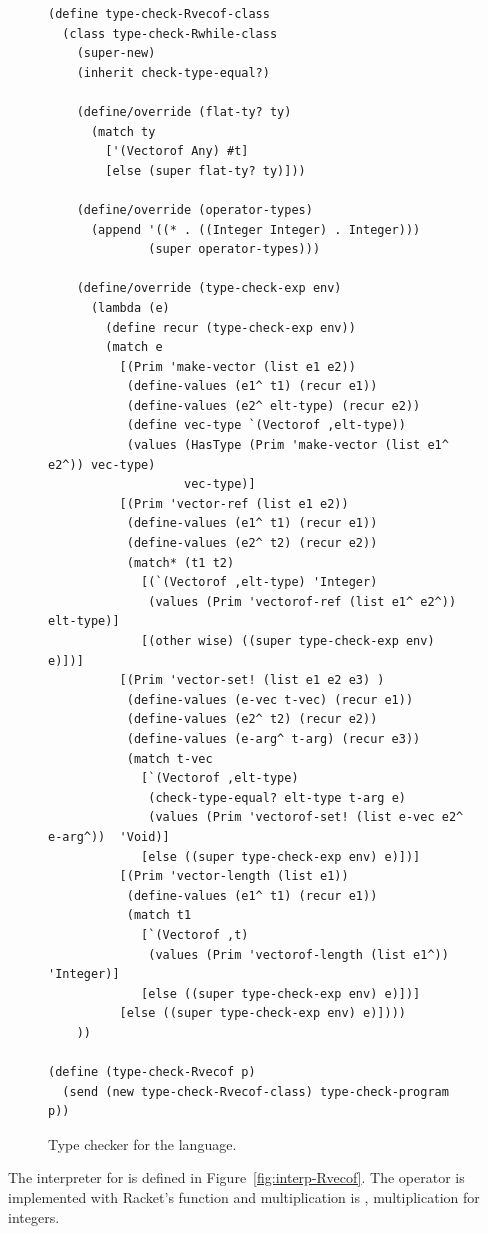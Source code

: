 \documentclass[11pt]{book}
\begin{document}
\begin{figure}[tbp]
\begin{lstlisting}[basicstyle=\ttfamily\footnotesize]
(define type-check-Rvecof-class
  (class type-check-Rwhile-class
    (super-new)
    (inherit check-type-equal?)

    (define/override (flat-ty? ty)
      (match ty
        ['(Vectorof Any) #t]
        [else (super flat-ty? ty)]))
    
    (define/override (operator-types)
      (append '((* . ((Integer Integer) . Integer)))
              (super operator-types)))
    
    (define/override (type-check-exp env)
      (lambda (e)
        (define recur (type-check-exp env))
        (match e
          [(Prim 'make-vector (list e1 e2))
           (define-values (e1^ t1) (recur e1))
           (define-values (e2^ elt-type) (recur e2))
           (define vec-type `(Vectorof ,elt-type))
           (values (HasType (Prim 'make-vector (list e1^ e2^)) vec-type)
                   vec-type)]
          [(Prim 'vector-ref (list e1 e2))
           (define-values (e1^ t1) (recur e1))
           (define-values (e2^ t2) (recur e2))
           (match* (t1 t2)
             [(`(Vectorof ,elt-type) 'Integer)
              (values (Prim 'vectorof-ref (list e1^ e2^)) elt-type)]
             [(other wise) ((super type-check-exp env) e)])]
          [(Prim 'vector-set! (list e1 e2 e3) )
           (define-values (e-vec t-vec) (recur e1))
           (define-values (e2^ t2) (recur e2))
           (define-values (e-arg^ t-arg) (recur e3))
           (match t-vec
             [`(Vectorof ,elt-type)
              (check-type-equal? elt-type t-arg e)
              (values (Prim 'vectorof-set! (list e-vec e2^ e-arg^))  'Void)]
             [else ((super type-check-exp env) e)])]
          [(Prim 'vector-length (list e1))
           (define-values (e1^ t1) (recur e1))
           (match t1
             [`(Vectorof ,t)
              (values (Prim 'vectorof-length (list e1^))  'Integer)]
             [else ((super type-check-exp env) e)])]
          [else ((super type-check-exp env) e)])))
    ))

(define (type-check-Rvecof p)
  (send (new type-check-Rvecof-class) type-check-program p))
\end{lstlisting}
\caption{Type checker for the \LangArray{} language.}
\label{fig:type-check-Rvecof}
\end{figure}

The interpreter for \LangArray{} is defined in
Figure~\ref{fig:interp-Rvecof}.  The  operator is
implemented with Racket's  function and
multiplication is , multiplication for 
integers.
\end{document}

